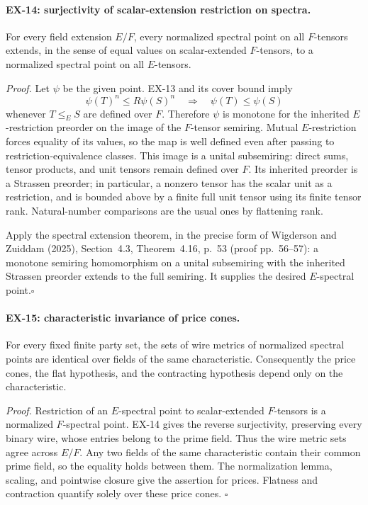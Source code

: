 \paragraph{EX-14: surjectivity of scalar-extension restriction on spectra.}
For every field extension $E/F$, every normalized spectral point on all
$F$-tensors extends, in the sense of equal values on scalar-extended
$F$-tensors, to a normalized spectral point on all $E$-tensors.

\emph{Proof.}
Let $\psi$ be the given point.  EX-13 and its cover bound imply
\[
 \psi(T)^n\leq R\psi(S)^n
 \quad\Longrightarrow\quad \psi(T)\leq\psi(S)
\]
whenever $T\leq_E S$ are defined over $F$.  Therefore $\psi$ is monotone for
the inherited $E$-restriction preorder on the image of the $F$-tensor
semiring.  Mutual $E$-restriction forces equality of its values, so the map
is well defined even after passing to restriction-equivalence classes.
This image is a unital subsemiring: direct sums, tensor products, and unit
tensors remain defined over $F$.  Its inherited preorder is a Strassen
preorder; in particular, a nonzero tensor has the scalar unit as a restriction,
and is bounded above by a finite full unit tensor using its finite tensor
rank.  Natural-number comparisons are the usual ones by flattening rank.

Apply the spectral extension theorem, in the precise form of Wigderson and
Zuiddam (2025), Section~4.3, Theorem~4.16, p.~53 (proof pp.~56--57): a
monotone semiring homomorphism on a unital subsemiring with the inherited
Strassen preorder extends to the full semiring.  It supplies the desired
$E$-spectral point.\hfill$\square$

\paragraph{EX-15: characteristic invariance of price cones.}
For every fixed finite party set, the sets of wire metrics of normalized
spectral points are identical over fields of the same characteristic.
Consequently the price cones, the flat hypothesis, and the contracting
hypothesis depend only on the characteristic.

\emph{Proof.}
Restriction of an $E$-spectral point to scalar-extended $F$-tensors is a
normalized $F$-spectral point.  EX-14 gives the reverse surjectivity, preserving
every binary wire, whose entries belong to the prime field.  Thus the wire
metric sets agree across $E/F$.  Any two fields of the same characteristic
contain their common prime field, so the equality holds between them.
The normalization lemma, scaling, and pointwise closure give the assertion
for prices.  Flatness and contraction quantify solely over these price cones.
\hfill$\square$

